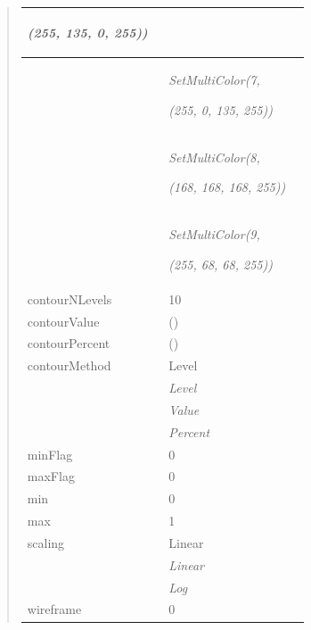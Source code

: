 \documentclass[letterpaper,10pt,english]{sphinxmanual}
\begin{document}
\begin{quote}
\begin{longtable}{|p{0.475\linewidth}|p{0.475\linewidth}|}
\begin{DUlineblock}{0em}
\item[] \emph{(255, 135, 0, 255))}
\end{DUlineblock}
\\
\hline & 
\begin{DUlineblock}{0em}
\item[] \emph{SetMultiColor(7,}
\item[] \emph{(255, 0, 135, 255))}
\end{DUlineblock}
\\
\hline & 
\begin{DUlineblock}{0em}
\item[] \emph{SetMultiColor(8,}
\item[] \emph{(168, 168, 168, 255))}
\end{DUlineblock}
\\
\hline & 
\begin{DUlineblock}{0em}
\item[] \emph{SetMultiColor(9,}
\item[] \emph{(255, 68, 68, 255))}
\end{DUlineblock}
\\
\hline
contourNLevels
 & 
10
\\
\hline
contourValue
 & 
()
\\
\hline
contourPercent
 & 
()
\\
\hline
contourMethod
 & 
Level
\\
\hline & 
\emph{Level}
\\
\hline & 
\emph{Value}
\\
\hline & 
\emph{Percent}
\\
\hline
minFlag
 & 
0
\\
\hline
maxFlag
 & 
0
\\
\hline
min
 & 
0
\\
\hline
max
 & 
1
\\
\hline
scaling
 & 
Linear
\\
\hline & 
\emph{Linear}
\\
\hline & 
\emph{Log}
\\
\hline
wireframe
 & 
0
\\
\hline\end{longtable}

\end{quote}

\begin{DUlineblock}{0em}
\item[] 
\end{DUlineblock}

\begin{DUlineblock}{0em}
\item[] 
\end{DUlineblock}
\end{document}
